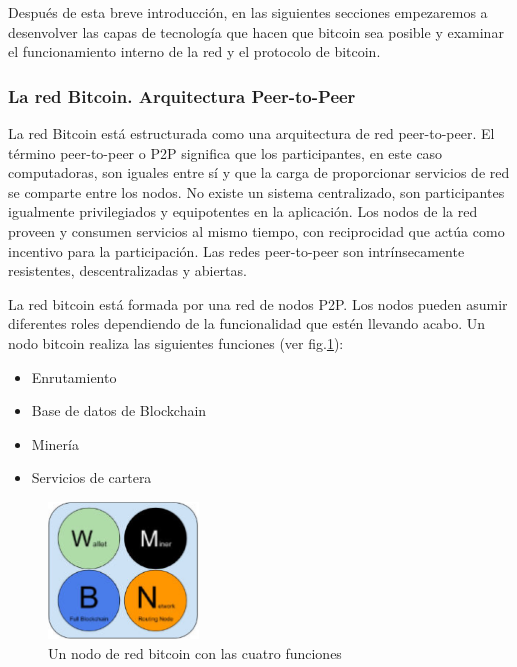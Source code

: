\noindent Después de esta breve introducción, en las siguientes secciones empezaremos a desenvolver las capas de 
tecnología que hacen que bitcoin sea posible y examinar el funcionamiento interno de la red y el protocolo de bitcoin.

\subsubsection{La red Bitcoin. Arquitectura Peer-to-Peer}

La red Bitcoin está estructurada como una arquitectura de red peer-to-peer. El término peer-to-peer o P2P significa 
que los participantes, en este caso computadoras, son iguales entre sí y que la carga de proporcionar servicios de red 
se comparte entre los nodos. No existe un sistema centralizado, son participantes igualmente privilegiados y 
equipotentes en la aplicación. Los nodos de la red proveen y consumen servicios al mismo tiempo, con reciprocidad que 
actúa como incentivo para la participación. Las redes peer-to-peer son intrínsecamente resistentes, descentralizadas y 
abiertas. 
 
\vspace{5mm}

\noindent La red bitcoin está formada por una red de nodos P2P. Los nodos pueden asumir diferentes roles dependiendo de 
la funcionalidad que estén llevando acabo. Un nodo bitcoin realiza las siguientes funciones (ver fig.\ref{fig:funciones-nodo}): 

\begin{itemize}
    \item Enrutamiento
    \item Base de datos de Blockchain
    \item Minería
    \item Servicios de cartera
\end{itemize}

\begin{figure}[ht!]
    \centering
    \includegraphics[width=4cm]{imagenes/introduccion/nodo_bitcoin}
    \caption{Un nodo de red bitcoin con las cuatro funciones}
    \label{fig:funciones-nodo}
\end{figure}

